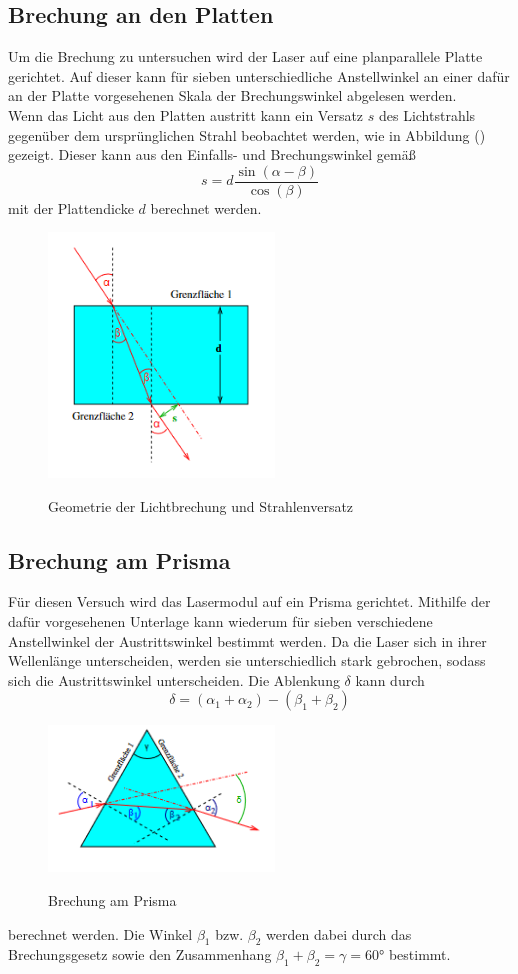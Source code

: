 \subsection{Brechung an den Platten}
Um die Brechung zu untersuchen wird der Laser auf eine planparallele Platte gerichtet. Auf dieser kann für sieben unterschiedliche Anstellwinkel an einer dafür an der Platte vorgesehenen Skala der Brechungswinkel abgelesen werden.\\
Wenn das Licht aus den Platten austritt kann ein Versatz $s$ des Lichtstrahls gegenüber dem ursprünglichen Strahl beobachtet werden, wie in Abbildung () gezeigt. Dieser kann aus den Einfalls- und Brechungswinkel gemäß
\begin{equation}
s=d \frac{\sin(\alpha - \beta)}{\cos(\beta)}
\end{equation}
mit der Plattendicke $d$ berechnet werden. \\
  \begin{figure} [h]
    \centering
    \includegraphics[width=6cm, keepaspectratio]{Planparallele Platten}
    \label{fig:Versatz}
    \caption{Geometrie der Lichtbrechung und Strahlenversatz}
 \end{figure}
\subsection{Brechung am Prisma}
Für diesen Versuch wird das Lasermodul auf ein Prisma gerichtet. Mithilfe der dafür vorgesehenen Unterlage kann wiederum für sieben verschiedene Anstellwinkel der Austrittswinkel bestimmt werden. Da die Laser sich in ihrer Wellenlänge unterscheiden, werden sie unterschiedlich stark gebrochen, sodass sich die Austrittswinkel unterscheiden.
Die Ablenkung $\delta$ kann durch
\begin{equation}
\delta=(\alpha_1 + \alpha_2)-(\beta_1 + \beta_2)
\end{equation}
\begin{figure} [h]
    \centering
    \includegraphics[width=6cm, keepaspectratio]{Brechung am Prisma}
    \label{fig:Prisma}
    \caption{Brechung am Prisma}
 \end{figure}
berechnet werden. Die Winkel $\beta_1$ bzw. $\beta_2$ werden dabei durch das Brechungsgesetz sowie den Zusammenhang $\beta_1+\beta_2=\gamma=60°$ bestimmt.
